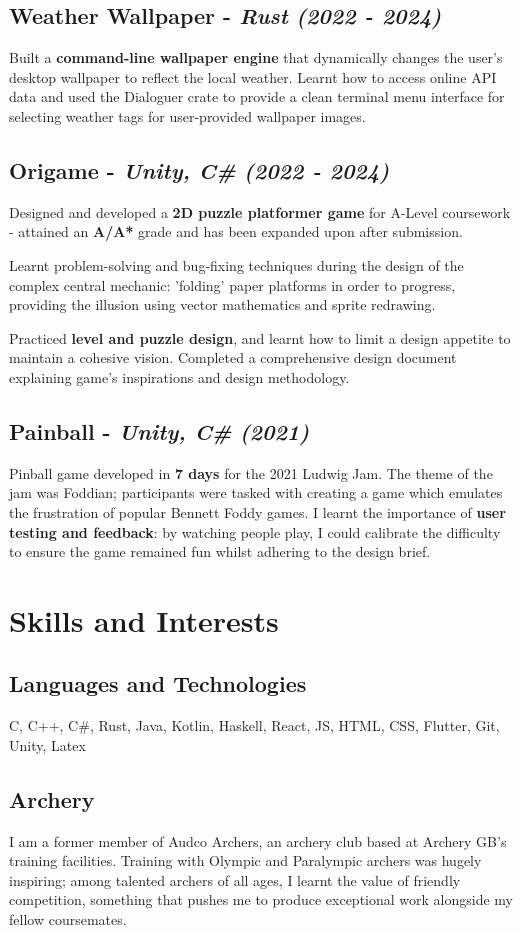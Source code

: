 \documentclass{article}
\newcommand{\dates}[1]{\hfill\textit{(#1)}}
\newcommand{\indentedblock}[1]{
    \hfill
    \begin{minipage}{\dimexpr\textwidth - 0.65cm}
        #1
    \end{minipage}
}
\newcommand{\project}[4]{
    \subsection*{\textbf{#1} - \textit{#3} \dates{#2}}
    \indentedblock{#4}
}
\begin{document}
\project{Weather Wallpaper}{2022 - 2024}{Rust}{
    Built a \textbf{command-line wallpaper engine} that dynamically changes the user's desktop wallpaper to reflect the local weather. 
    Learnt how to access online API data and used the Dialoguer crate to provide a clean terminal menu interface for selecting weather tags for 
    user-provided wallpaper images.
}

\project{Origame}{2022 - 2024}{Unity, C\#}{
    Designed and developed a \textbf{2D puzzle platformer game} for A-Level coursework - attained an \textbf{A/A*} grade
    and has been expanded upon after submission. 
 
    Learnt problem-solving and bug-fixing techniques during the design of the complex central mechanic: 
    'folding' paper platforms in order to progress, providing the illusion using vector mathematics and sprite redrawing.
 
    Practiced \textbf{level and puzzle design}, and learnt how to limit a design appetite to maintain a cohesive vision.  
    Completed a comprehensive design document explaining game's inspirations and design methodology.
}

\project{Painball}{2021}{Unity, C\#}{
    Pinball game developed in \textbf{7 days} for the 2021 Ludwig Jam. The theme of the jam was Foddian; 
    participants were tasked with creating a game which emulates the frustration of popular Bennett Foddy games.
    I learnt the importance of \textbf{user testing and feedback}: by watching people play, I could calibrate the difficulty
    to ensure the game remained fun whilst adhering to the design brief. 
}
    

\section*{Skills and Interests}

\subsection*{\textbf{Languages and Technologies}}
\indentedblock{
    C, C++, C\#, Rust, Java, Kotlin, Haskell, React, JS, HTML, CSS, Flutter, Git, Unity, Latex
}

\subsection*{\textbf{Archery}}
\indentedblock{
    I am a former member of Audco Archers, an archery club based at Archery GB's training facilities.
    Training with Olympic and Paralympic archers was hugely inspiring; among talented archers of all ages, 
    I learnt the value of friendly competition, something that pushes me to produce exceptional work alongside 
    my fellow coursemates.
}
\end{document}
